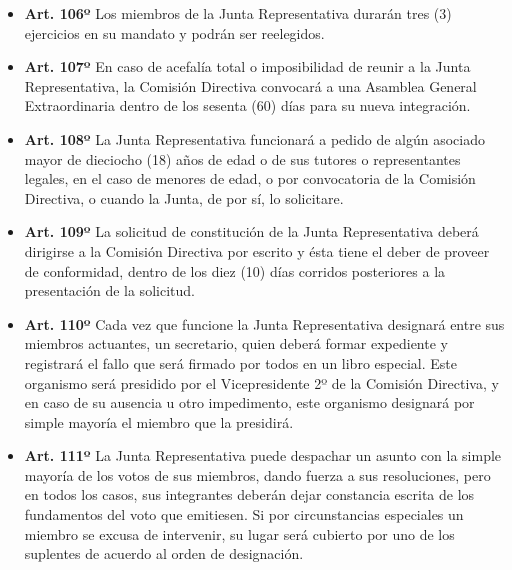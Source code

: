 \documentclass[openany]{book}
\providecommand{\tightlist}{%
  \setlength{\itemsep}{0pt}\setlength{\parskip}{0pt}}
\begin{document}
\begin{itemize}
\tightlist
\item
  \textbf{Art. 106º}
  Los miembros de la Junta Representativa durarán tres (3) ejercicios en su mandato y podrán ser reelegidos.
\end{itemize}

\begin{itemize}
\tightlist
\item
  \textbf{Art. 107º}
  En caso de acefalía total o imposibilidad de reunir a la Junta Representativa, la Comisión Directiva convocará a una Asamblea General Extraordinaria dentro de los sesenta (60) días para su nueva integración.
\end{itemize}

\begin{itemize}
\tightlist
\item
  \textbf{Art. 108º}
  La Junta Representativa funcionará a pedido de algún asociado mayor de dieciocho (18) años de edad o de sus tutores o representantes legales, en el caso de menores de edad, o por convocatoria de la Comisión Directiva, o cuando la Junta, de por sí, lo solicitare.
\end{itemize}

\begin{itemize}
\tightlist
\item
  \textbf{Art. 109º}
  La solicitud de constitución de la Junta Representativa deberá dirigirse a la Comisión Directiva por escrito y ésta tiene el deber de proveer de conformidad, dentro de los diez (10) días corridos posteriores a la presentación de la solicitud.
\end{itemize}

\begin{itemize}
\tightlist
\item
  \textbf{Art. 110º}
  Cada vez que funcione la Junta Representativa designará entre sus miembros actuantes, un secretario, quien deberá formar expediente y registrará el fallo que será firmado por todos en un libro especial. Este organismo será presidido por el Vicepresidente 2º de la Comisión Directiva, y en caso de su ausencia u otro impedimento, este organismo designará por simple mayoría el miembro que la presidirá.
\end{itemize}

\begin{itemize}
\tightlist
\item
  \textbf{Art. 111º}
  La Junta Representativa puede despachar un asunto con la simple mayoría de los votos de sus miembros, dando fuerza a sus resoluciones, pero en todos los casos, sus integrantes deberán dejar constancia escrita de los fundamentos del voto que emitiesen. Si por circunstancias especiales un miembro se excusa de intervenir, su lugar será cubierto por uno de los suplentes de acuerdo al orden de designación.
\end{itemize}
\end{document}

